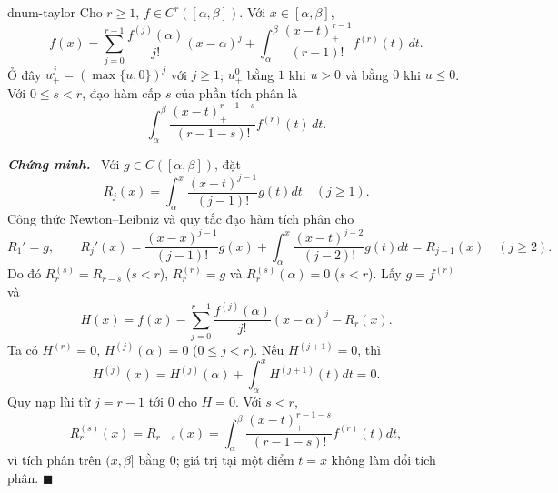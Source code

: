 \documentclass[12pt,a4paper,oneside]{book}
\numberwithin{algorithm}{chapter}
\theoremstyle{definition}
\newenvironment{chungminh}{\par\medskip\noindent\textbf{\textit{\color{mainblue}Chứng minh.}}\ }{\hfill$\blacksquare$\par\medskip}
\begin{document}
\begin{bode}{}{dnum-taylor}
Cho $r\geq1$, $f\in C^r([\alpha,\beta])$. Với $x\in[\alpha,\beta]$,
\begin{equation}\label{eq:dnum-taylor-integral}
 f(x)=\sum_{j=0}^{r-1}\frac{f^{(j)}(\alpha)}{j!}(x-\alpha)^j
 +\int_\alpha^\beta\frac{(x-t)_+^{r-1}}{(r-1)!}f^{(r)}(t)\,dt.
\end{equation}
Ở đây $u_+^j=(\max\{u,0\})^j$ với $j\geq1$; $u_+^0$ bằng $1$ khi $u>0$ và bằng $0$ khi $u\leq0$. Với $0\leq s<r$, đạo hàm cấp $s$ của phần tích phân là
\[
 \int_\alpha^\beta\frac{(x-t)_+^{r-1-s}}{(r-1-s)!}f^{(r)}(t)\,dt.
\]
\end{bode}
\begin{chungminh}
Với $g\in C([\alpha,\beta])$, đặt
\[
 R_j(x)=\int_\alpha^x\frac{(x-t)^{j-1}}{(j-1)!}g(t)dt\quad(j\geq1).
\]
Công thức Newton--Leibniz và quy tắc đạo hàm tích phân cho
\[
 R_1'=g,\qquad
 R_j'(x)=\frac{(x-x)^{j-1}}{(j-1)!}g(x)
 +\int_\alpha^x\frac{(x-t)^{j-2}}{(j-2)!}g(t)dt=R_{j-1}(x)\quad(j\geq2).
\]
Do đó $R_r^{(s)}=R_{r-s}$ ($s<r$), $R_r^{(r)}=g$ và $R_r^{(s)}(\alpha)=0$ ($s<r$). Lấy $g=f^{(r)}$ và
\[
 H(x)=f(x)-\sum_{j=0}^{r-1}\frac{f^{(j)}(\alpha)}{j!}(x-\alpha)^j-R_r(x).
\]
Ta có $H^{(r)}=0$, $H^{(j)}(\alpha)=0$ ($0\leq j<r$). Nếu $H^{(j+1)}=0$, thì
\[
 H^{(j)}(x)=H^{(j)}(\alpha)+\int_\alpha^xH^{(j+1)}(t)dt=0.
\]
Quy nạp lùi từ $j=r-1$ tới $0$ cho $H=0$. Với $s<r$,
\[
 R_r^{(s)}(x)=R_{r-s}(x)
 =\int_\alpha^\beta\frac{(x-t)_+^{r-1-s}}{(r-1-s)!}f^{(r)}(t)dt,
\]
vì tích phân trên $(x,\beta]$ bằng $0$; giá trị tại một điểm $t=x$ không làm đổi tích phân.
\end{chungminh}
\end{document}
